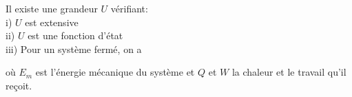 \documentclass[a4paper]{article}
\begin{document}
\pagestyle{fancy}
\fancyhf{}
\setlength{\headheight}{15pt}

\begin{center}
	\large{}
\end{center}


Il existe une grandeur \(U\) vérifiant:\\
i) \(U\) est extensive\\
ii) \(U\) est une fonction d'état\\
iii) Pour un système fermé, on a
\begin{center}\end{center}
où \(E_m\) est l'énergie mécanique du système et \(Q\) et \(W\) la chaleur et le travail qu'il reçoit.
\end{document}
